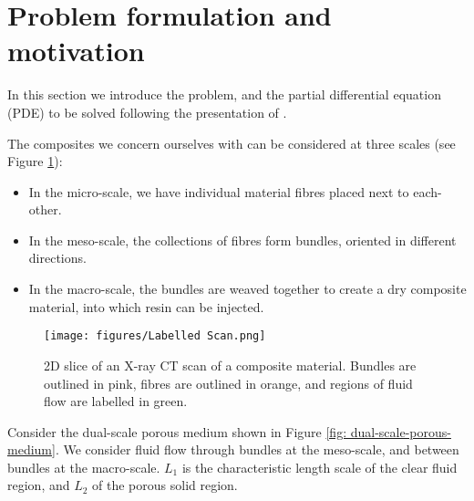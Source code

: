 \documentclass[12pt]{article}
\theoremstyle{theorem}
\begin{document}
\section{Problem formulation and motivation}\label{sec: problem-formulation}

In this section we introduce the problem, and the partial differential equation (PDE) to be solved following the presentation of \cite{chen2023}.

The composites we concern ourselves with can be considered at three scales (see Figure \ref{fig: x-ray-ct}):
\begin{itemize}
    \item In the micro-scale, we have individual material fibres placed next to each-other.
    \item In the meso-scale, the collections of fibres form bundles, oriented in different directions.
    \item In the macro-scale, the bundles are weaved together to create a dry composite material, into which resin can be injected.
\end{itemize}

\begin{figure}[h!]
    \centering
    \texttt{[image: figures/Labelled Scan.png]}
    \caption{2D slice of an X-ray CT scan of a composite material. Bundles are outlined in pink, fibres are outlined in orange, and regions of fluid flow are labelled in green.}
    \label{fig: x-ray-ct}
\end{figure}

Consider the dual-scale porous medium shown in Figure \ref{fig: dual-scale-porous-medium}. We consider fluid flow through bundles at the meso-scale, and between bundles at the macro-scale. $L_1$ is the characteristic length scale of the clear fluid region, and $L_2$ of the porous solid region.
\end{document}
